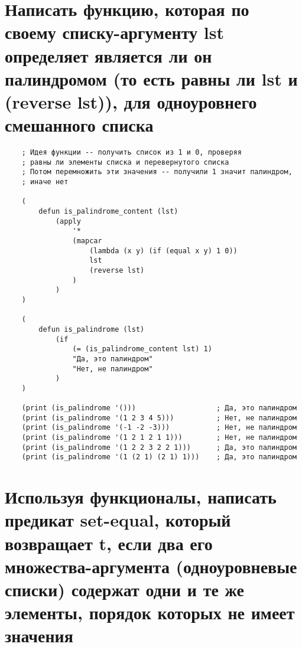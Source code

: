 \section{Написать функцию, которая по своему списку-аргументу lst определяет является ли он палиндромом (то есть равны ли lst и (reverse lst)), для одноуровнего смешанного списка}

\begin{lstlisting}
    ; Идея функции -- получить список из 1 и 0, проверяя 
    ; равны ли элементы списка и перевернутого списка
    ; Потом перемножить эти значения -- получили 1 значит палиндром, 
    ; иначе нет

    (
        defun is_palindrome_content (lst)
            (apply 
                '* 
                (mapcar 
                    (lambda (x y) (if (equal x y) 1 0)) 
                    lst 
                    (reverse lst)
                )
            )
    )
    
    (
        defun is_palindrome (lst)
            (if 
                (= (is_palindrome_content lst) 1) 
                "Да, это палиндром" 
                "Нет, не палиндром"
            )
    )
    
    (print (is_palindrome '()))                   ; Да, это палиндром
    (print (is_palindrome '(1 2 3 4 5)))          ; Нет, не палиндром
    (print (is_palindrome '(-1 -2 -3)))           ; Нет, не палиндром
    (print (is_palindrome '(1 2 1 2 1 1)))        ; Нет, не палиндром
    (print (is_palindrome '(1 2 2 3 2 2 1)))      ; Да, это палиндром
    (print (is_palindrome '(1 (2 1) (2 1) 1)))    ; Да, это палиндром
\end{lstlisting}

\section{Используя функционалы, написать предикат set-equal, который возвращает t, если два его множества-аргумента (одноуровневые списки) содержат одни и те же элементы, порядок которых не имеет значения}

